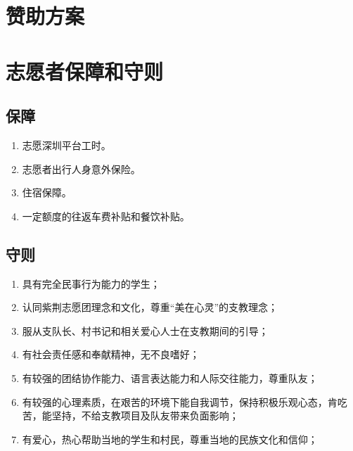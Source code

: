 \documentclass[12pt]{ctexart}
\begin{document}
\begin{appendix}
\section{赞助方案}



\section{志愿者保障和守则}
\subsection{保障}
\begin{enumerate}
\item 志愿深圳平台工时。
\item 志愿者出行人身意外保险。
\item 住宿保障。
\item 一定额度的往返车费补贴和餐饮补贴。
\end{enumerate}
\subsection{守则}
\begin{enumerate}[label = {(\chinese*)}]
\item 具有完全民事行为能力的学生；
\item 认同紫荆志愿团理念和文化，尊重“美在心灵”的支教理念；
\item 服从支队长、村书记和相关爱心人士在支教期间的引导；
\item 有社会责任感和奉献精神，无不良嗜好；
\item 有较强的团结协作能力、语言表达能力和人际交往能力，尊重队友；
\item 有较强的心理素质，在艰苦的环境下能自我调节，保持积极乐观心态，肯吃苦，能坚持，不给支教项目及队友带来负面影响； 
\item 有爱心，热心帮助当地的学生和村民，尊重当地的民族文化和信仰；
\end{enumerate}
\end{appendix}
\end{document}
